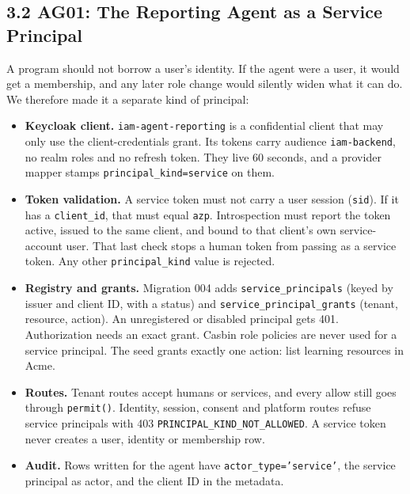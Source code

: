 \documentclass{article}
\begin{document}
\subsection*{3.2 AG01: The Reporting Agent as a Service Principal}
A program should not borrow a user's identity. If the agent were a user, it would get a membership, and any later role change would silently widen what it can do. We therefore made it a separate kind of principal:

\begin{itemize}
    \item \textbf{Keycloak client.} \texttt{iam-agent-reporting} is a confidential client that may only use the client-credentials grant. Its tokens carry audience \texttt{iam-backend}, no realm roles and no refresh token. They live 60 seconds, and a provider mapper stamps \texttt{principal\_kind=service} on them.
    \item \textbf{Token validation.} A service token must not carry a user session (\texttt{sid}). If it has a \texttt{client\_id}, that must equal \texttt{azp}. Introspection must report the token active, issued to the same client, and bound to that client's own service-account user. That last check stops a human token from passing as a service token. Any other \texttt{principal\_kind} value is rejected.
    \item \textbf{Registry and grants.} Migration 004 adds \texttt{service\_principals} (keyed by issuer and client ID, with a status) and \texttt{service\_principal\_grants} (tenant, resource, action). An unregistered or disabled principal gets 401. Authorization needs an exact grant. Casbin role policies are never used for a service principal. The seed grants exactly one action: list learning resources in Acme.
    \item \textbf{Routes.} Tenant routes accept humans or services, and every allow still goes through \texttt{permit()}. Identity, session, consent and platform routes refuse service principals with 403 \texttt{PRINCIPAL\_KIND\_NOT\_ALLOWED}. A service token never creates a user, identity or membership row.
    \item \textbf{Audit.} Rows written for the agent have \texttt{actor\_type='service'}, the service principal as actor, and the client ID in the metadata.
\end{itemize}
\end{document}
